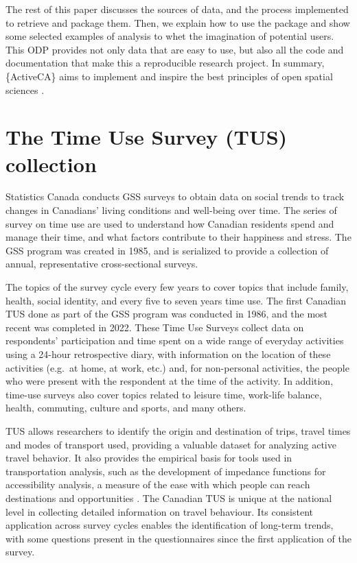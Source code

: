 \documentclass[Royal,times,sageh]{sagej}
\begin{document}
The rest of this paper discusses the sources of data, and the process
implemented to retrieve and package them. Then, we explain how to use
the package and show some selected examples of analysis to whet the
imagination of potential users. This ODP provides not only data that are
easy to use, but also all the code and documentation that make this a
reproducible research project. In summary, \{ActiveCA\} aims to
implement and inspire the best principles of open spatial sciences
\citep{paez_open_2021, brunsdon_opening_2021}.

\section{The Time Use Survey (TUS)
collection}\label{the-time-use-survey-tus-collection}

Statistics Canada \citeyearpar{statisticscanada2024} conducts GSS
surveys to obtain data on social trends to track changes in Canadians'
living conditions and well-being over time. The series of survey on time
use are used to understand how Canadian residents spend and manage their
time, and what factors contribute to their happiness and stress. The GSS
program was created in 1985, and is serialized to provide a collection
of annual, representative cross-sectional surveys.

The topics of the survey cycle every few years to cover topics that
include family, health, social identity, and every five to seven years
time use. The first Canadian TUS done as part of the GSS program was
conducted in 1986, and the most recent was completed in 2022. These Time
Use Surveys \citep{statisticscanada2022} collect data on respondents'
participation and time spent on a wide range of everyday activities
using a 24-hour retrospective diary, with information on the location of
these activities (e.g.~at home, at work, etc.) and, for non-personal
activities, the people who were present with the respondent at the time
of the activity. In addition, time-use surveys also cover topics related
to leisure time, work-life balance, health, commuting, culture and
sports, and many others.

TUS allows researchers to identify the origin and destination of trips,
travel times and modes of transport used, providing a valuable dataset
for analyzing active travel behavior. It also provides the empirical
basis for tools used in transportation analysis, such as the development
of impedance functions for accessibility analysis, a measure of the ease
with which people can reach destinations and opportunities
\citep{hansen1959}. The Canadian TUS is unique at the national level in
collecting detailed information on travel behaviour. Its consistent
application across survey cycles enables the identification of long-term
trends, with some questions present in the questionnaires since the
first application of the survey.
\end{document}
